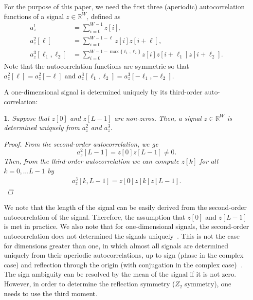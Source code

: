 \documentclass[english]{article}
\numberwithin{equation}{section}
\theoremstyle{plain}
\theoremstyle{definition}
\theoremstyle{remark}
\theoremstyle{plain}
\theoremstyle{remark}
\theoremstyle{plain}
\theoremstyle{plain}
\newtheorem{proposition}[thm]{\protect\propositionname}
\providecommand{\propositionname}{Proposition}
\begin{document}
For the purpose of this paper, we need the first three (aperiodic) autocorrelation functions of a signal $z\in\mathbb{R}^W$, defined as
\begin{align} \label{eq:autocorrelations}
a_z^1 &= \sum_{i=0}^{W-1} z[i], \nonumber\\
a_z^2[\ell] &= \sum_{i=0}^{W-1-\ell} z[i]z[i+\ell], \nonumber\\
a_z^3[\ell_1,\ell_2] &= \sum_{i=0}^{W-1-\max\{\ell_1,\ell_2\}} z[i]z[i+\ell_1]z[i+\ell_2]. 
\end{align}
Note that the autocorrelation functions are symmetric so that $a_z^2[\ell] = a_z^2[-\ell]$ and $a_z^3[\ell_1,\ell_2] = a_z^3[-\ell_1,-\ell_2]$. 

A one-dimensional signal is determined uniquely by its third-order auto-correlation:
\begin{proposition}
	Suppose that $z[0]$ and $z[L-1]$ are non-zeros. Then, a signal $z\in\mathbb{R}^W$ is determined uniquely from  $a_z^2$ and $a_z^3$.
	\begin{proof}
		From the second-order autocorrelation, we ge
		\begin{equation*}
		a_z^2[L-1] = z[0]z[L-1]\neq 0.
		\end{equation*}
		Then, from the third-order autocorrelation we can compute $z[k]$ for all $k=0,\ldots L-1$ by
		\begin{eqnarray}
		a_z^3[k,L-1] = z[0]z[k]z[L-1].
		\end{eqnarray}
	\end{proof}
\end{proposition}
We note that the length of the signal can be easily derived from the second-order autocorrelation of the signal. Therefore, the assumption that $z[0]$ and $z[L-1]$ is met in practice. We also note that for one-dimensional signals, the second-order autocorrelation does not determined the signals uniquely~\cite{beinert2015ambiguities,bendory2017fourier}. This is not the case for dimensions greater than one, in which almost all signals are determined uniquely from their aperiodic autocorrelations, up to sign (phase in the complex case) and reflection through the origin (with conjugation in the complex case)~\cite{hayes1982reconstruction,hayes1982reducible,bendory2017fourier}. The sign ambiguity can be resolved by the mean of the signal if it is not zero. However,  in order to determine the reflection symmetry ($Z_2$ symmetry), one needs to use the third moment.
\end{document}
